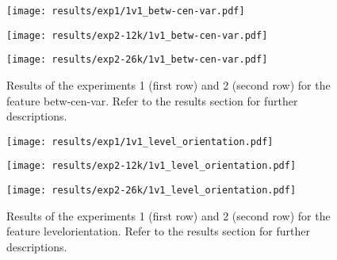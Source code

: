  
\begin{figure}[h!]
    \centering
	\begin{minipage}{0.3\linewidth}
		\texttt{[image: results/exp1/1v1\_betw-cen-var.pdf]}
	\end{minipage}

	\begin{minipage}{0.3\linewidth}
		\texttt{[image: results/exp2-12k/1v1\_betw-cen-var.pdf]}
	\end{minipage}
	\begin{minipage}{0.3\linewidth}
		\texttt{[image: results/exp2-26k/1v1\_betw-cen-var.pdf]}
	\end{minipage}

	\caption[ Results: Feature betw-cen-var]{ Results of the experiments 1 (first row) and 2 (second row) for the feature betw-cen-var. Refer to the results section for further descriptions. }
	\label{fig:appendix_betw-cen-var}
\end{figure}
 
\begin{figure}[h!]
    \centering
	\begin{minipage}{0.3\linewidth}
		\texttt{[image: results/exp1/1v1\_level\_orientation.pdf]}
	\end{minipage}

	\begin{minipage}{0.3\linewidth}
		\texttt{[image: results/exp2-12k/1v1\_level\_orientation.pdf]}
	\end{minipage}
	\begin{minipage}{0.3\linewidth}
		\texttt{[image: results/exp2-26k/1v1\_level\_orientation.pdf]}
	\end{minipage}

	\caption[ Results: Feature level\textunderscore orientation]{ Results of the experiments 1 (first row) and 2 (second row) for the feature level\textunderscore orientation. Refer to the results section for further descriptions. }
	\label{fig:appendix_level_orientation}
\end{figure}